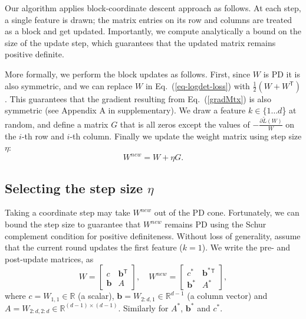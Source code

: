 \documentclass{article} %
\newcommand\mat[1]{{#1}}
\renewcommand\vec[1]{\mathbf{#1}}
\newcommand{\T}{{}^\mathsf{T}}
\newcommand{\W}{\mat{W}}
\newcommand{\newW}{{\mat{W^{new}}}}
\newcommand{\R}{\mathbb{R}}
\newcommand{\tL}{\tilde{L}(\W)}
\newcommand{\B}{\vec{b}}
\newcommand{\C}{c}
\newcommand{\grd}{\frac{\partial \tL}{\W}}
\newcommand{\Wvec}{\W_{2:d,1}}
\newcommand{\Wscalar}{\W_{1,1}}
\renewcommand{\eqref}[1]{Eq.~(\ref{#1})}
\begin{document}
Our algorithm applies block-coordinate descent approach as follows.
At each step, a single feature is drawn; the matrix entries on its row and columns are treated as a block and get updated. Importantly, we compute analytically a bound on the size of the update step, which guarantees that the updated matrix remains positive definite.

More formally, we perform the block updates as follows. First, since $\W$ is PD it is also symmetric, and we can replace $\W$ in \eqref{eq-logdet-loss} with $\tfrac{1}{2}(\W + \W\T)$. This guarantees that the gradient resulting from \eqref{gradMtx} is also symmetric (see Appendix A in supplementary). We draw a feature $k \in \{1 \ldots d$\} at random, and define a matrix $G$ that is all zeros except the values of $-\grd$ on the $i$-th row and $i$-th column. Finally we update the weight matrix using step size $\eta$:
\begin{equation}
    \newW = \W +\eta G.
\label{updateEq}
\end{equation}
\subsection{Selecting the step size $\eta$}\label{subsec:step}
Taking a coordinate step may take $\newW$ out of the PD cone. Fortunately, we can bound the step size to guarantee that $\newW$ remains PD using the Schur complement condition for positive definiteness. Without loss of generality, assume that the current round updates the first feature ($k = 1$). We write the pre- and post-update
matrices, as
\begin{equation}
  \W = \left[ \begin{matrix} \C & \B\T \\ \B & A \end{matrix} \right],
  \quad
  \newW = \left[ \begin{matrix} \C^* & \B^*\T \\ \B^* & A^* \end{matrix} \right],
  \label{schurNotationPreUpdate}
\end{equation}
 where $\C = \Wscalar \in \R$ (a scalar), $\B = \Wvec \in
\R^{d-1}$ (a column vector) and $A = \W_{2:d,2:d} \in \R^{(d-1)
\times (d-1)}$. Similarly for $A^*$, $\B^*$ and $\C^*$.
\end{document}
